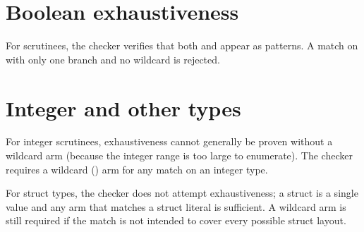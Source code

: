 \section{Boolean exhaustiveness}
\label{sec:exh-bool}

\pnum
For  scrutinees, the checker verifies that both  and
 appear as patterns.  A match on  with only one branch
and no wildcard is rejected.

\section{Integer and other types}
\label{sec:exh-other}

\pnum
For integer scrutinees, exhaustiveness cannot generally be proven without a
wildcard arm (because the integer range is too large to enumerate).  The checker
requires a wildcard () arm for any match on an integer type.

\pnum
For struct types, the checker does not attempt exhaustiveness; a struct is a
single value and any arm that matches a struct literal is sufficient.  A
wildcard arm is still required if the match is not intended to cover every
possible struct layout.
